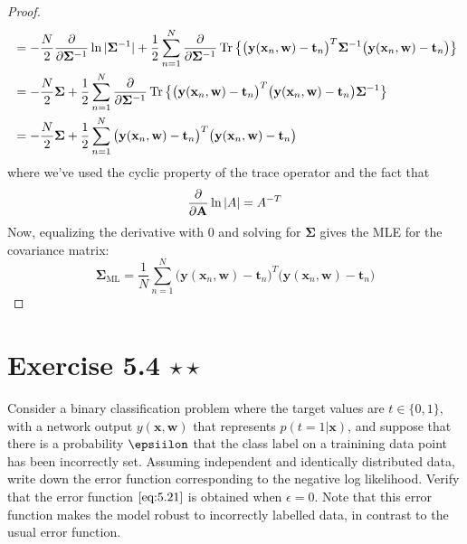 \begin{proof}
\begin{align*}
        &= -\frac{N}{2} \pdv{\mathbf{\Sigma}^{-1}} \ln |\mathbf{\Sigma}^{-1}| +
        \frac{1}{2}  \sum_{n=1}^{N} \pdv{\mathbf{\Sigma}^{-1}} 
        \Trace\big\{\big(\mathbf{y}(\mathbf{x}_n, \mathbf{w}) - \mathbf{t}_n\big)^T
        \mathbf{\Sigma}^{-1}\big(\mathbf{y}(\mathbf{x}_n, \mathbf{w}) - \mathbf{t}_n\big)\big\} \\
        &= -\frac{N}{2} \mathbf{\Sigma} 
        + \frac{1}{2}  \sum_{n=1}^{N} \pdv{\mathbf{\Sigma}^{-1}} 
        \Trace\big\{\big(\mathbf{y}(\mathbf{x}_n, \mathbf{w}) - \mathbf{t}_n\big)^T
        \big(\mathbf{y}(\mathbf{x}_n, \mathbf{w}) - \mathbf{t}_n\big) \mathbf{\Sigma}^{-1}\big\}\\
        &= -\frac{N}{2} \mathbf{\Sigma} + \frac{1}{2} \sum_{n=1}^{N} 
        \big(\mathbf{y}(\mathbf{x}_n, \mathbf{w}) - \mathbf{t}_n\big)^T
        \big(\mathbf{y}(\mathbf{x}_n, \mathbf{w}) - \mathbf{t}_n\big)
    \end{align*}
    where we've used the cyclic property of the trace operator and the fact that
    \[
        \pdv{\mathbf{A}} \ln |A| = A^{-T}
    \]
    Now, equalizing
    the derivative with 0 and solving for $\mathbf{\Sigma}$ gives
    the MLE for the covariance matrix:
    \[
        \mathbf{\Sigma}_\text{ML}
        = \frac{1}{N} \sum_{n=1}^{N} 
        \big(\mathbf{y}(\mathbf{x}_n, \mathbf{w}) - \mathbf{t}_n\big)^T
        \big(\mathbf{y}(\mathbf{x}_n, \mathbf{w}) - \mathbf{t}_n\big)
    \] 
\end{proof}

\section*{Exercise 5.4 $\star \star$}
Consider a binary classification problem where the target values
are $t \in \{0, 1\}$, with a network output $y(\mathbf{x}, \mathbf{w})$
that represents $p(t = 1 | \mathbf{x})$, and suppose that
there is a probability $\epsiilon$ that the class label
on a trainining data point has been incorrectly set.
Assuming independent and identically distributed data,
write down the error function corresponding to the negative
log likelihood. Verify that the error function $\eqref{eq:5.21}$
is obtained when $\epsilon = 0$. Note that this error function
makes the model robust to incorrectly labelled data, in contrast
to the usual error function.

\vspace{1em}

